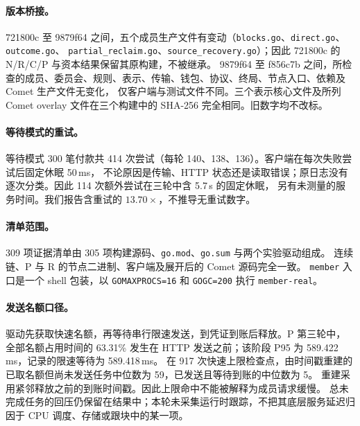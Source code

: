 \paragraph{版本桥接。}
721800c 至 9879f64 之间，五个成员生产文件有变动（\texttt{blocks.go}、\texttt{direct.go}、\texttt{outcome.go}、
\texttt{partial\_reclaim.go}、\texttt{source\_recovery.go}）；因此 721800c 的 N/R/C/P 与资本结果保留其原构建，不被继承。
9879f64 至 f856c7b 之间，所检查的成员、委员会、规则、表示、传输、钱包、协议、终局、节点入口、依赖及 Comet 生产文件无变化，
仅客户端与测试文件不同。三个表示核心文件及所列 Comet overlay 文件在三个构建中的 SHA-256 完全相同。旧数字均不改标。

\paragraph{等待模式的重试。}
等待模式 300 笔付款共 414 次尝试（每轮 140、138、136）。客户端在每次失败尝试后固定休眠 50\,ms，
不论原因是传输、HTTP 状态还是读取错误；原日志没有逐次分类。因此 114 次额外尝试在三轮中含 5.7\,s 的固定休眠，
另有未测量的服务时间。我们报告含重试的 $13.70\times$，不推导无重试数字。

\paragraph{清单范围。}
309 项证据清单由 305 项构建源码、\texttt{go.mod}、\texttt{go.sum} 与两个实验驱动组成。
连续链、P 与 R 的节点二进制、客户端及展开后的 Comet 源码完全一致。
\texttt{member} 入口是一个 shell 包装，以 \texttt{GOMAXPROCS=16} 和 \texttt{GOGC=200}
执行 \texttt{member-real}。

\paragraph{发送名额口径。}
驱动先获取快速名额，再等待串行限速发送，到凭证到账后释放。P 第三轮中，全部名额占用时间的
63.31\% 发生在 HTTP 发送之前；该阶段 P95 为 589.422\,ms，记录的限速等待为 589.418\,ms。
在 917 次快速上限检查点，由时间戳重建的已取名额但尚未发送任务中位数为 59，已发送且等待到账的中位数为 5。
重建采用紧邻释放之前的到账时间戳。因此上限命中不能被解释为成员请求缓慢。
总未完成任务的回压仍保留在结果中；本轮未采集运行时跟踪，不把其底层服务延迟归因于 CPU 调度、存储或跟块中的某一项。
